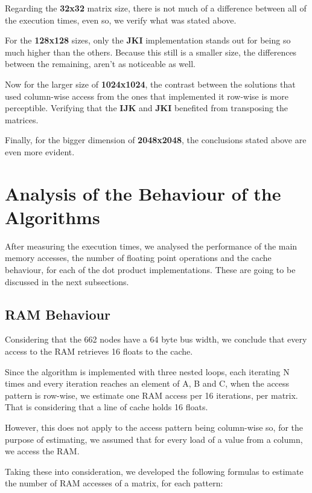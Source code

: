 \documentclass[twoside,twocolumn]{article}
\begin{document}
Regarding the \textbf{32x32} matrix size, there is not much of a difference between all of the execution times, even so, we verify what was stated above.

For the \textbf{128x128} sizes, only the \textbf{JKI} implementation stands out for being so much higher than the others. Because this still is a smaller size, the differences between the remaining, aren't as noticeable as well.

Now for the larger size of \textbf{1024x1024}, the contrast between the solutions that used column-wise access from the ones that implemented it row-wise is more perceptible. Verifying that the \textbf{IJK} and \textbf{JKI} benefited from transposing the matrices.

Finally, for the bigger dimension of \textbf{2048x2048}, the conclusions stated above are even more evident.

\section{Analysis of the Behaviour of the Algorithms}

After measuring the execution times, we analysed the performance of the main memory accesses, the number of floating point operations and the cache behaviour, for each of the dot product implementations. These are going to be discussed in the next subsections.

\subsection{RAM Behaviour}

Considering that the 662 nodes have a 64 byte bus width, we conclude that every access to the RAM retrieves 16 floats to the cache.

Since the algorithm is implemented with three nested loops, each iterating N times and every iteration reaches an element of A, B and C, when the access pattern is row-wise, we estimate one RAM access per 16 iterations, per matrix. That is considering that a line of cache holds 16 floats.

However, this does not apply to the access pattern being column-wise so, for the purpose of estimating, we assumed that for every load of a value from a column, we access the RAM.

Taking these into consideration, we developed the following formulas to estimate the number of RAM accesses of a matrix, for each pattern:
\end{document}
